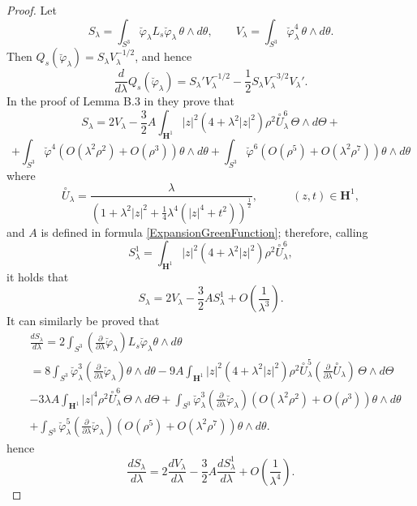 \documentclass[10pt,a4paper]{amsart}
\renewcommand{\phi}{\varphi}
\newcommand{\de}{\partial}
\renewcommand{\H}{\mathbf{H}}
\renewcommand{\l}{\lambda }
\renewcommand{\th }{\theta }
\begin{document}
\begin{proof}
  Let
\[
    S_\lambda=\int_{S^3}\breve\phi_\lambda L_s\breve\phi_\lambda\,
\theta\wedge d\theta,
\qquad
V_\lambda=\int_{S^3}\breve\phi_\lambda^4\,\theta\wedge d\theta .
\]
Then \(Q_s(\breve\phi_\lambda)=S_\lambda V_\lambda^{-1/2}\), and hence
\begin{equation}\label{FormulaDerivative}
    \frac{d}{d\lambda}Q_s(\breve\phi_\lambda)
=
S_\lambda' V_\lambda^{-1/2}
-\frac12 S_\lambda V_\lambda^{-3/2}V_\lambda' .
\end{equation}
In the proof of Lemma B.3 in \cite{CMY2} they prove that
$$S_{\lambda} = 2V_{\lambda} -\frac{3}{2}A\int_{\H^1} |z|^2 (4 + \lambda^2 |z|^2) \rho^2 \overset{\circ}{U}_\lambda^6\, \Theta\wedge d\Theta + $$
$$+\int_{S^3} \breve{\phi}^4 (O (\l^2 \rho^2) + O(\rho^3)) \th \wedge d \th + \int_{S^3} \breve{\phi}^6 (O(\rho^5) + O(\l^2 \rho^7))  \th \wedge d \th$$
where
\[
  \overset{\circ}{U}_\l = \frac{\l}{\left( 1 + \l^2 |z|^2 + \frac 14 \l^4 (|z|^4 + t^2) \right)^{\frac 12}}, 
  \qquad \quad (z,t) \in \H^1,
\]
and $A$ is defined in formula \eqref{ExpansionGreenFunction};
therefore, calling
$$S^1_{\lambda}= \int_{\H^1} |z|^2 (4 + \lambda^2 |z|^2) \rho^2 \overset{\circ}{U}_\lambda^6,$$
it holds that
$$S_{\lambda} = 2V_{\lambda} -\frac{3}{2}AS^1_{\lambda} +O\left(\frac{1}{\l^3}\right).$$
It can similarly be proved that
 \begin{align}
& \frac{dS_{\lambda}}{d\lambda} 
=2\int_{S^3}\left(\frac{\de}{\de\lambda}\breve{\phi}_{\lambda} \right)L_s \breve{\phi}_\lambda \theta \wedge d \theta \nonumber\\
&=8 \int_{S^3} \breve{\phi}_\lambda^3\left(\frac{\de}{\de\lambda}\breve{\phi}_{\lambda} \right) \theta \wedge d \theta  - 9A \int_{\H^1} |z|^2 (4 + \lambda^2 |z|^2) \rho^2 \overset{\circ}{U}_\lambda^5\left(\frac{\de}{\de\lambda}\overset{\circ}{U}_{\lambda} \right) \, \Theta\wedge d\Theta \nonumber\\
&- 3\lambda A \int_{\H^1} |z|^4 \rho^2 \overset{\circ}{U}_\lambda^6 \, \Theta\wedge d\Theta + \int_{S^3} \breve{\phi}_{\lambda}^3\left(\frac{\de}{\de\lambda}\breve{\phi}_{\lambda} \right) (O (\lambda^2 \rho^2) + O(\rho^3)) \theta \wedge d \theta \nonumber\\
&+\int_{S^3} \breve{\phi}_{\lambda}^5\left(\frac{\de}{\de\lambda}\breve{\phi}_{\lambda} \right) (O(\rho^5) + O(\lambda^2 \rho^7))
  \theta \wedge d \theta . \nonumber
  \end{align}
hence
$$\frac{dS_{\lambda}}{d\lambda} = 2\frac{dV_{\lambda}}{d\lambda} - \frac{3}{2}A\frac{dS^1_{\lambda}}{d\lambda} + O\left(\frac{1}{\l^4}\right).$$

\end{proof}
\end{document}
